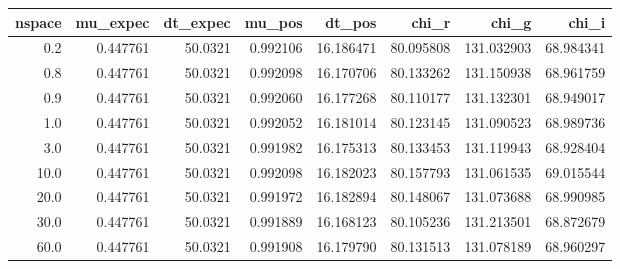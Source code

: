 \begin{tabular}{rrrrrrrr}
\toprule
 nspace &  mu\_expec &  dt\_expec &    mu\_pos &     dt\_pos &      chi\_r &       chi\_g &      chi\_i \\
\midrule
    0.2 &  0.447761 &   50.0321 &  0.992106 &  16.186471 &  80.095808 &  131.032903 &  68.984341 \\
    0.8 &  0.447761 &   50.0321 &  0.992098 &  16.170706 &  80.133262 &  131.150938 &  68.961759 \\
    0.9 &  0.447761 &   50.0321 &  0.992060 &  16.177268 &  80.110177 &  131.132301 &  68.949017 \\
    1.0 &  0.447761 &   50.0321 &  0.992052 &  16.181014 &  80.123145 &  131.090523 &  68.989736 \\
    3.0 &  0.447761 &   50.0321 &  0.991982 &  16.175313 &  80.133453 &  131.119943 &  68.928404 \\
   10.0 &  0.447761 &   50.0321 &  0.992098 &  16.182023 &  80.157793 &  131.061535 &  69.015544 \\
   20.0 &  0.447761 &   50.0321 &  0.991972 &  16.182894 &  80.148067 &  131.073688 &  68.990985 \\
   30.0 &  0.447761 &   50.0321 &  0.991889 &  16.168123 &  80.105236 &  131.213501 &  68.872679 \\
   60.0 &  0.447761 &   50.0321 &  0.991908 &  16.179790 &  80.131513 &  131.078189 &  68.960297 \\
\bottomrule
\end{tabular}
